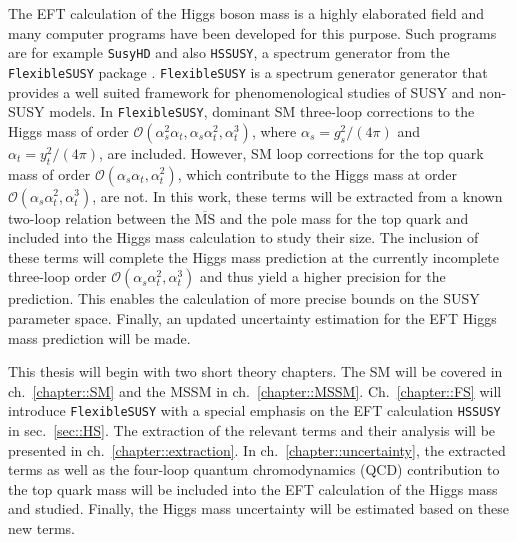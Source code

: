 \documentclass[a4paper,12pt]{book}
\begin{document}
The EFT calculation of the Higgs boson mass is a highly elaborated field and many computer programs have been developed for this purpose. Such programs are for example \texttt{SusyHD} \cite{susyhd} and also \texttt{HSSUSY}, a spectrum generator from the \texttt{FlexibleSUSY} package \cite{FS,FS2}. \texttt{FlexibleSUSY} is a spectrum generator generator that provides a well suited framework for phenomenological studies of SUSY and non-SUSY models. In \texttt{FlexibleSUSY}, dominant SM three-loop corrections to the Higgs mass of order $\mathcal{O}(\alpha_s^2 \alpha_t, \alpha_s \alpha_t^2, \alpha_t^3)$, where $\alpha_s = g_s^2/(4\pi)$ and $\alpha_t = y_t^2/(4\pi)$, are included. However, SM loop corrections for the top quark mass of order $\mathcal{O}(\alpha_s \alpha_t, \alpha_t^2)$, which contribute to the Higgs mass at order $\mathcal{O}(\alpha_s \alpha_t^2, \alpha_t^3)$, are not. In this work, these terms will be extracted from a known two-loop relation between the $\overline{\text{MS}}$ and the pole mass for the top quark \cite{martinmain} and included into the Higgs mass calculation to study their size. The inclusion of these terms will complete the Higgs mass prediction at the currently incomplete three-loop order $\mathcal{O}(\alpha_s\alpha_t^2,\alpha_t^3)$ and thus yield a higher precision for the prediction. This enables the calculation of more precise bounds on the SUSY parameter space. Finally, an updated uncertainty estimation for the EFT Higgs mass prediction will be made.\par
This thesis will begin with two short theory chapters. The SM will be covered in ch.\ \ref{chapter::SM} and the MSSM in ch.\ \ref{chapter::MSSM}. Ch.\ \ref{chapter::FS} will introduce \texttt{FlexibleSUSY} with a special emphasis on the EFT calculation \texttt{HSSUSY} in sec.\ \ref{sec::HS}. The extraction of the relevant terms and their analysis will be presented in ch.\ \ref{chapter::extraction}. In ch.\ \ref{chapter::uncertainty}, the extracted terms as well as the four-loop quantum chromodynamics (QCD) contribution to the top quark mass will be included into the EFT calculation of the Higgs mass and studied. Finally, the Higgs mass uncertainty will be estimated based on these new terms. 
\clearpage
\end{document}
